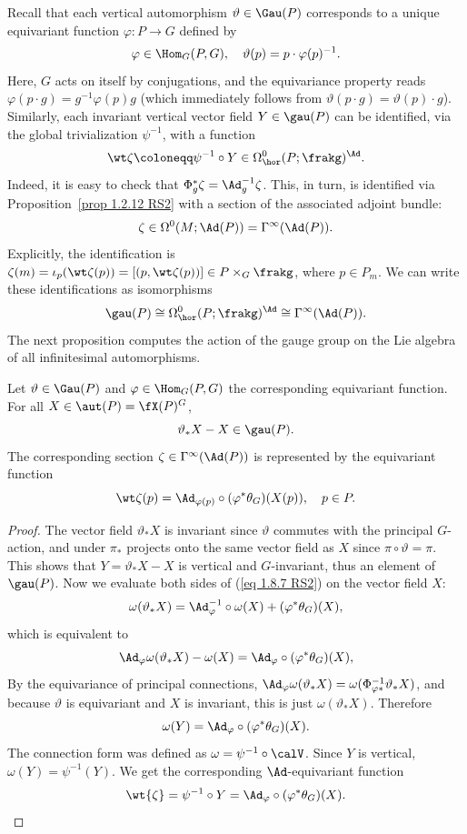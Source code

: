 Recall that each vertical automorphism $\vartheta\in \Gau(P)$ corresponds to a unique equivariant function $\varphi:P\to G$ defined by 
\[\varphi\in \Hom_G(P,G),\quad \vartheta(p)=p\cdot \varphi(p)^{-1}.\]
Here, $G$ acts on itself by conjugations, and the equivariance property reads $\varphi(p\cdot g)=g^{-1}\varphi(p)g$ (which immediately follows from $\vartheta(p\cdot g)=\vartheta(p)\cdot g$). Similarly, each invariant vertical vector field $Y\in \gau(P)$ can be identified, via the global trivialization $\psi^{-1}$, with a function 
\[\wt\zeta\coloneqq \psi^{-1}\circ Y\in \Omega^0_{\hor}(P;\frakg)^\Ad.\]
Indeed, it is easy to check that $\Phi_g^\ast \zeta=\Ad_g^{-1}\zeta$. This, in turn, is identified via Proposition~\ref{prop 1.2.12 RS2} with a section of the associated adjoint bundle:
\[\zeta\in \Omega^0(M;\Ad(P))=\Gamma^\infty(\Ad(P)).\]
Explicitly, the identification is $\zeta(m)=\iota_p(\wt\zeta(p))=[(p,\wt\zeta(p))]\in P\times_G \frakg$, where $p\in P_m$.
We can write these identifications as isomorphisms
\[\gau(P)\cong \Omega^0_{\hor}(P;\frakg)^\Ad\cong \Gamma^\infty(\Ad(P)).\]
The next proposition computes the action of the gauge group on the Lie algebra of all infinitesimal automorphisms.

\begin{prop}
    Let $\vartheta\in\Gau(P)$ and $\varphi\in \Hom_G(P,G)$ the corresponding equivariant function. For all $X\in\aut(P)=\fX(P)^G$,
    \[\vartheta_\ast X-X\in\gau(P).\]
    The corresponding section $\zeta \in\Gamma^\infty(\Ad(P))$ is represented by the equivariant function
    \[\wt\zeta(p)=\Ad_{\varphi(p)}\circ(\varphi^\ast \theta_G)(X(p)),\quad p\in P.\]
\end{prop}
\begin{proof}
    The vector field $\vartheta_\ast X$ is invariant since $\vartheta$ commutes with the principal $G$-action, and under $\pi_\ast$ projects onto the same vector field as $X$ since $\pi\circ\vartheta=\pi$. This shows that $Y=\vartheta_\ast X-X$ is vertical and $G$-invariant, thus an element of $\gau(P)$. Now we evaluate both sides of (\ref{eq 1.8.7 RS2}) on the vector field $X$:
    \[\omega(\vartheta_\ast X)=\Ad_{\varphi}^{-1}\circ \omega(X)+(\varphi^\ast \theta_G)(X),\]
    which is equivalent to
    \[\Ad_\varphi\omega(\vartheta_\ast X)-\omega(X)=\Ad_\varphi\circ (\varphi^\ast \theta_G)(X),\]
    By the equivariance of principal connections, $\Ad_\varphi\omega(\vartheta_\ast X)=\omega(\Phi_{\varphi\ast}^{-1}\vartheta_\ast X)$, and because $\vartheta$ is equivariant and $X$ is invariant, this is just $\omega(\vartheta_\ast X)$. Therefore
    \[\omega(Y)=\Ad_\varphi\circ (\varphi^\ast \theta_G)(X).\]
    The connection form was defined as $\omega=\psi^{-1}\circ\calV$. Since $Y$ is vertical, $\omega(Y)=\psi^{-1}(Y)$. We get the corresponding $\Ad$-equivariant function
    \[\wt{\zeta}=\psi^{-1}\circ Y=\Ad_\varphi\circ (\varphi^\ast\theta_G)(X).\]
\end{proof}

